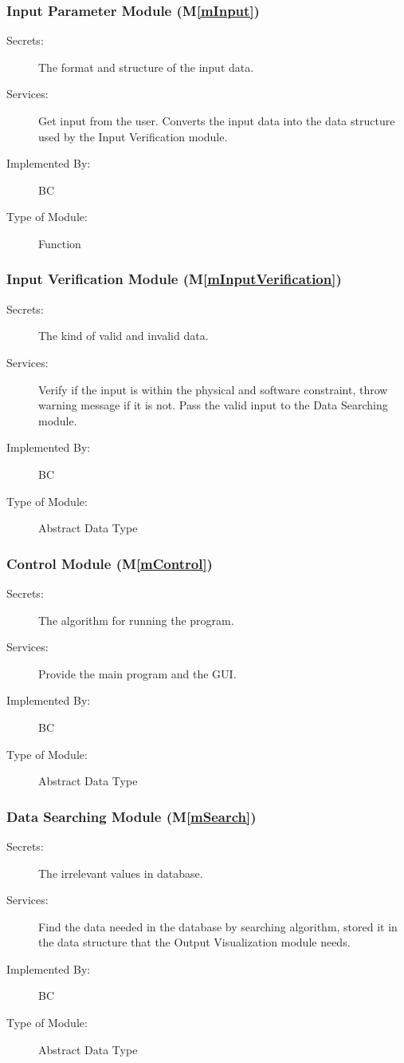 \documentclass[12pt, titlepage]{article}
\newcommand{\mref}[1]{M\ref{#1}}
\begin{document}
\subsubsection{Input Parameter Module (\mref{mInput})}

\begin{description}
\item[Secrets:] The format and structure of the input data. 
\item[Services:] Get input from the user. Converts the input data into the data structure used by the Input Verification module.
\item[Implemented By:] BC
\item[Type of Module:] Function
\end{description}


\subsubsection{Input Verification Module (\mref{mInputVerification})}

\begin{description}
\item[Secrets:] The kind of valid and invalid data. 
\item[Services:] Verify if the input is within the physical and software constraint, throw warning message if it is not. Pass the valid input to the Data Searching module.
\item[Implemented By:] BC
\item[Type of Module:] Abstract Data Type
\end{description}


\subsubsection{Control Module (\mref{mControl})}
\begin{description}
\item[Secrets:] The algorithm for running the program.
\item[Services:] Provide the main program and the GUI.
\item[Implemented By:] BC
\item[Type of Module:] Abstract Data Type
\end{description}

\subsubsection{Data Searching Module (\mref{mSearch})}
\begin{description}
\item[Secrets:] The irrelevant values in database.
\item[Services:] Find the data needed in the database by searching algorithm, stored it in the data structure that the Output Visualization module needs.
\item[Implemented By:] BC
\item[Type of Module:] Abstract Data Type
\end{description}
\end{document}

